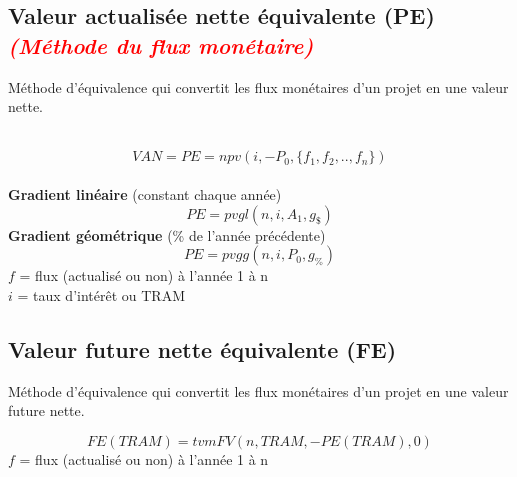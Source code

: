 \subsection{Valeur actualisée nette équivalente (PE) \textcolor{red}{\textit{(Méthode du flux monétaire)}}}
     Méthode d'équivalence qui convertit les flux monétaires d'un projet en une valeur nette.\\
    
    \noindent{}\\
    \begin{RoundBox}
        $$VAN=PE=npv(i,-P_0,\{f_1, f_2, .., f_n\})$$\\
        \textbf{Gradient linéaire} (constant chaque année)
        $$PE=pvgl(n,i,A_1,g_\$)$$
        \textbf{Gradient géométrique} (\% de l'année précédente)
        $$PE=pvgg(n,i,P_0,g_\%)$$
        {\scriptsize
            $f$ = flux (actualisé ou non) à l'année 1 à n\\
            $i$ =  taux d'intérêt ou TRAM
        }
    \end{RoundBox}
    \noindent{}
    
\subsection{Valeur future nette équivalente (FE)}
     Méthode d'équivalence qui convertit les flux monétaires d'un projet en une valeur future nette.
    \begin{RoundBox}
        $$FE(TRAM)=tvmFV(n, TRAM,-PE(TRAM),0)$$
        {\scriptsize
            $f$ = flux (actualisé ou non) à l'année 1 à n
        }
    \end{RoundBox}
    \noindent{}

